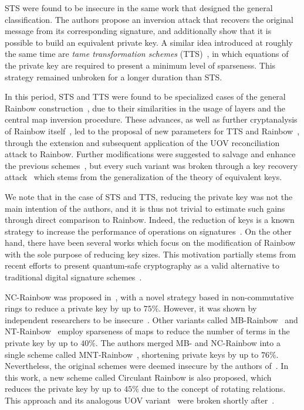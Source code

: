 \documentclass[draft, 12pt, a4paper, oneside]{memoir}
\begin{document}
STS were found to be insecure in the same work that designed the general classification. The authors propose an inversion attack that recovers the original message from its corresponding signature, and additionally show that it is possible to build an equivalent private key. A similar idea introduced at roughly the same time are \emph{tame transformation schemes} (TTS)~\cite{}, in which equations of the private key are required to present a minimum level of sparseness. This strategy remained unbroken for a longer duration than STS. 

In this period, STS and TTS were found to be specialized cases of the general Rainbow construction~\cite{Ding:200806}, due to their similarities in the usage of layers and the central map inversion procedure. These advances, as well as further cryptanalysis of Rainbow itself~\cite{Billet:200609}, led to the proposal of new parameters for TTS and Rainbow~\cite{Ding:200806}, through the extension and subsequent application of the UOV reconciliation attack to Rainbow. Further modifications were suggested to salvage and enhance the previous schemes~\cite{}, but every such variant was broken through a key recovery attack~\cite{Thomae:201207} which stems from the generalization of the theory of equivalent keys.

We note that in the case of STS and TTS, reducing the private key was not the main intention of the authors, and it is thus not trivial to estimate such gains through direct comparison to Rainbow. Indeed, the reduction of keys is a known strategy to increase the performance of operations on signatures~\cite{}. On the other hand, there have been several works which focus on the modification of Rainbow with the sole purpose of reducing key sizes. This motivation partially stems from recent efforts to present quantum-safe cryptography as a valid alternative to traditional digital signature schemes~\cite{}.

NC-Rainbow was proposed in~\cite{}, with a novel strategy based in non-commutative rings to reduce a private key by up to $75\%$. However, it was shown by independent researchers to be insecure~\cite{}. Other variants called MB-Rainbow~\cite{} and NT-Rainbow~\cite{} employ sparseness of maps to reduce the number of terms in the private key by up to $40\%$. The authors merged MB- and NC-Rainbow into a single scheme called MNT-Rainbow~\cite{}, shortening private keys by up to $76\%$. Nevertheless, the original schemes were deemed insecure by the authors of~\cite{}. In this work, a new scheme called Circulant Rainbow is also proposed, which reduces the private key by up to $45\%$ due to the concept of rotating relations. This approach and its analogous UOV variant~\cite{} were broken shortly after~\cite{}.
\end{document}
